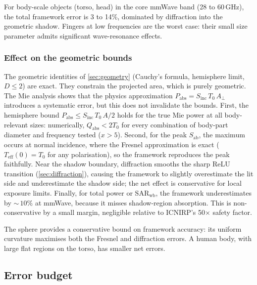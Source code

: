 \documentclass[11pt,a4paper]{article}
\theoremstyle{definition}      %
\newcommand{\Sinc}{S_{\mathrm{inc}}}
\newcommand{\Sab}{S_{\mathrm{ab}}}
\newcommand{\Teff}{T_{\mathrm{eff}}}
\newcommand{\Aperp}{A_{\perp}}
\newcommand{\SARwb}{\mathrm{SAR}_{\mathrm{wb}}}
\begin{document}
For body-scale objects (torso, head) in the core mmWave band
(28 to 60\,GHz), the total framework error is 3 to 14\%, dominated by
diffraction into the geometric shadow.  Fingers at low frequencies are
the worst case: their small size parameter admits significant
wave-resonance effects.

\subsubsection{Effect on the geometric bounds}

The geometric identities of \cref{sec:geometry} (Cauchy's formula,
hemisphere limit, $D\le 2$) are exact. They constrain the projected
area, which is purely geometric.  The Mie analysis shows that the
physics approximation $P_{\mathrm{abs}}=\Sinc\,T_0\,\Aperp$
introduces a systematic error, but this does not invalidate the
bounds.
First, the hemisphere bound
$P_{\mathrm{abs}}\le\Sinc\,T_0\,A/2$ holds for the
true Mie power at all body-relevant sizes: numerically,
$Q_{\mathrm{abs}}<2T_0$ for every combination of body-part
diameter and frequency tested ($x>5$).
Second, for the peak $\Sab$, the maximum occurs at normal incidence, where
the Fresnel approximation is exact ($\Teff(0)=T_0$ for any
polarisation), so the framework reproduces the peak faithfully.
Near the shadow boundary, diffraction smooths the sharp ReLU
transition (\cref{sec:diffraction}), causing the framework to
slightly overestimate the lit side and underestimate the shadow
side; the net effect is conservative for local exposure limits.
Finally, for total power or $\SARwb$, the framework underestimates by
${\sim}\,10\%$ at mmWave, because it misses shadow-region
absorption.  This is non-conservative by a small margin, negligible
relative to ICNIRP's 50$\times$ safety factor.

The sphere provides a conservative bound on framework accuracy: its
uniform curvature maximises both the Fresnel and diffraction errors.
A human body, with large flat regions on the torso, has smaller net
errors.

\subsection{Error budget}\label{sec:error-budget}
\end{document}
